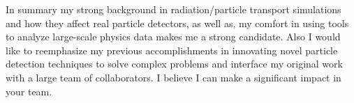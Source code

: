 \documentclass[11pt]{article} %
\begin{document}
In summary my strong background in radiation/particle transport simulations and
how they affect real particle detectors, as well as, my comfort in using tools
to analyze large-scale physics data makes me a strong candidate. Also I would
like to reemphasize my previous accomplishments in innovating novel particle
detection techniques to solve complex problems and interface my original work
with a large team of collaborators. I believe I can make a significant impact
in your team.

%
%
%
\end{document}
